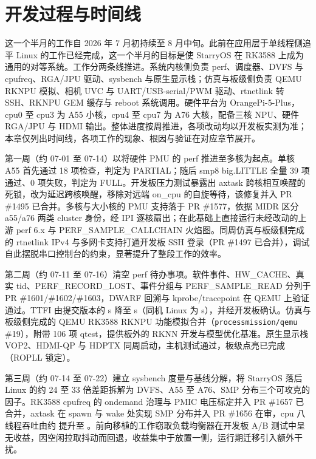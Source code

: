 \section{开发过程与时间线}

这一个半月的工作自 2026 年 7 月初持续至 8 月中旬。此前在应用层于单线程侧追平 Linux 的工作已经完成，这一个半月的目标是使 StarryOS 在 RK3588 上成为通用的对等系统。工作分两条线推进。系统内核侧负责 perf、调度器、DVFS 与 cpufreq、RGA/JPU 驱动、sysbench 与原生显示栈；仿真与板级侧负责 QEMU RKNPU 模拟、相机 UVC 与 UART/USB-serial/PWM 驱动、rtnetlink 转 SSH、RKNPU GEM 缓存与 reboot 系统调用。硬件平台为 OrangePi-5-Plus，cpu0 至 cpu3 为 A55 小核，cpu4 至 cpu7 为 A76 大核，配备三核 NPU、硬件 RGA/JPU 与 HDMI 输出。整体进度按周推进，各项改动均以开发板实测为准；本章仅列出时间线，各项工作的现象、根因与验证在对应章节展开。


第一周（约 07-01 至 07-14）以将硬件 PMU 的 perf 推进至多核为起点。单核 A55 首先通过 18 项检查，判定为 PARTIAL；随后 smp8 big.LITTLE 全量 39 项通过、0 项失败，判定为 FULL。开发板压力测试暴露出 axtask 跨核相互唤醒的死锁，改为延迟跨核唤醒，移除对远端 on\_cpu 的自旋等待，该修复并入 PR \#1495 已合并。多核与大小核的 PMU 支持落于 PR \#1577，依据 MIDR 区分 a55/a76 两类 cluster 身份，经 IPI 逐核扇出；在此基础上直接运行未经改动的上游 perf 6.x 与 PERF\_SAMPLE\_CALLCHAIN 火焰图。同周仿真与板级侧完成的 rtnetlink IPv4 与多网卡支持打通开发板 SSH 登录（PR \#1497 已合并），调试自此摆脱串口控制台的约束，显著提升了整段工作的效率。

第二周（约 07-11 至 07-16）清空 perf 待办事项。软件事件、HW\_CACHE、真实 tid、PERF\_RECORD\_LOST、事件分组与 PERF\_SAMPLE\_READ 分列于 PR \#1601/\#1602/\#1603，DWARF 回溯与 kprobe/tracepoint 在 QEMU 上验证通过。TTFI 由提交版本的 \nTtfiBefore{} s 降至 \nTtfi s（同机 Linux 为 \nTtfiLin s），并经开发板确认。仿真与板级侧完成的 QEMU RK3588 RKNPU 功能模拟合并（\texttt{processmission/qemu} \#19），附带 106 项 qtest，提供板外的 RKNN 开发与模型优化基准。原生显示栈 VOP2、HDMI-QP 与 HDPTX 同周启动，主机测试通过，板级点亮已完成（ROPLL 锁定）。

第三周（约 07-14 至 07-22）建立 sysbench 度量与基线分解，将 StarryOS 落后 Linux 的约 24 至 33 倍差距拆解为 DVFS、A55 至 A76、SMP 分布三个可攻克的因子。RK3588 cpufreq 的 ondemand 治理与 PMIC 电压标定并入 PR \#1657 已合并，axtask 在 spawn 与 wake 处实现 SMP 分布并入 PR \#1656 在审，cpu 八线程吞吐由约 \nLadderBase 提升至 \nLadderA。前向移植的工作窃取负载均衡器在开发板 A/B 测试中呈无收益，因空闲拉取抖动而回退，收益集中于放置一侧，运行期迁移引入额外干扰。

